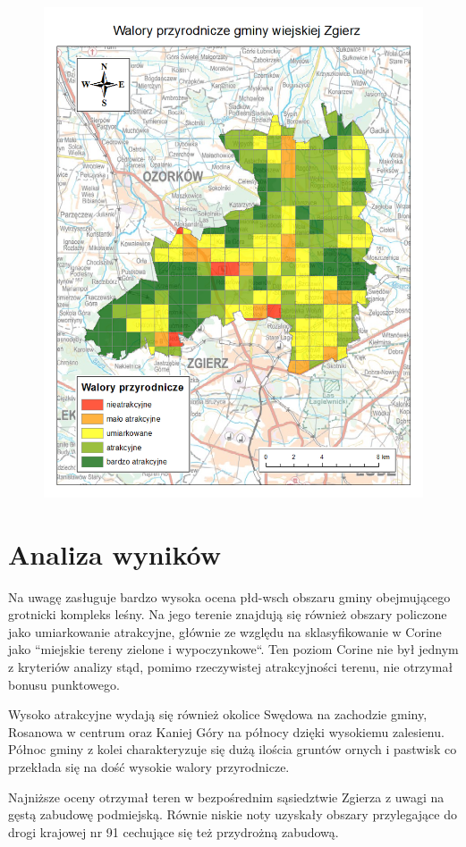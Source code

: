 \documentclass[11pt]{article} %
\begin{document}
\begin{figure}[H]
\centering
\includegraphics[scale=0.65]{final-ptbon.png}
\end{figure}

\section{Analiza wyników}

Na uwagę zasługuje bardzo wysoka ocena płd-wsch obszaru gminy obejmującego grotnicki kompleks leśny. Na jego terenie znajdują się również obszary policzone jako umiarkowanie atrakcyjne, głównie ze względu na sklasyfikowanie w Corine jako ``miejskie tereny zielone i wypoczynkowe``. Ten poziom Corine nie był jednym z kryteriów analizy stąd, pomimo rzeczywistej atrakcyjności terenu, nie otrzymał bonusu punktowego.

Wysoko atrakcyjne wydają się również okolice Swędowa na zachodzie gminy, Rosanowa w centrum oraz Kaniej Góry na północy dzięki wysokiemu zalesienu. Północ gminy z kolei charakteryzuje się dużą ilościa gruntów ornych i pastwisk co przekłada się na dość wysokie walory przyrodnicze.

Najniższe oceny otrzymał teren w bezpośrednim sąsiedztwie Zgierza z uwagi na gęstą zabudowę podmiejską. Równie niskie noty uzyskały obszary przylegające do drogi krajowej nr 91 cechujące się też przydrożną zabudową.
\end{document}
